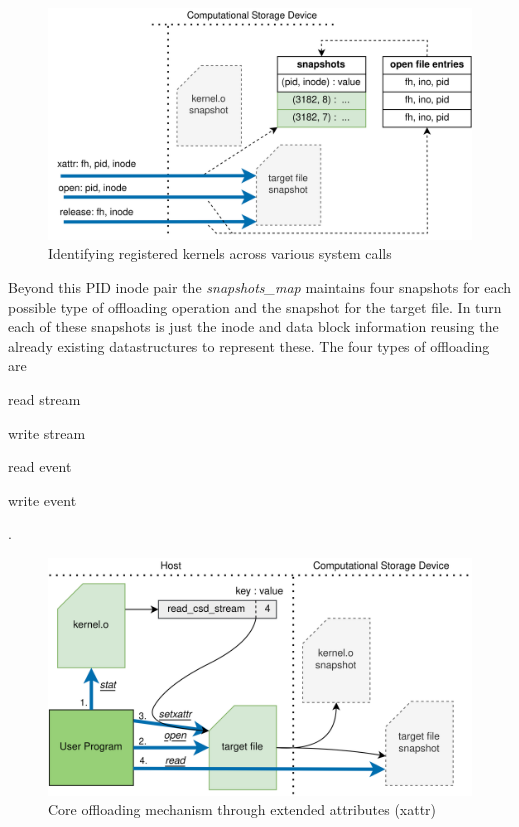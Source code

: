 \begin{figure}
    \centering
	\includegraphics[width=1\textwidth]{resources/images/offloading-management.png}
	\caption{Identifying registered kernels across various system calls}
    \label{figure:offloadingmanagement}
\end{figure}

Beyond this PID inode pair the \textit{snapshots\_map} maintains four snapshots
for each possible type of offloading operation and the snapshot for the target
file. In turn each of these snapshots is just the inode and data block
information reusing the already existing datastructures to represent these.
The four types of offloading are \begin{enumerate*} \item read stream
\item write stream \item read event \item write event \end{enumerate*}.


\begin{figure}
    \centering
	\includegraphics[width=1\textwidth]{resources/images/offloading.png}
	\caption{Core offloading mechanism through extended attributes (xattr)}
    \label{figure:offloading}
\end{figure}

